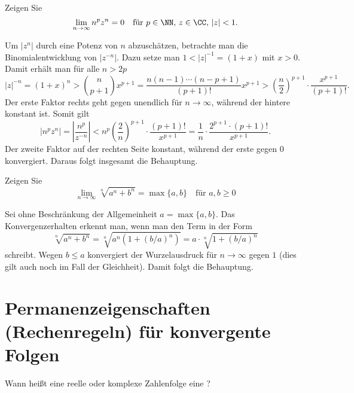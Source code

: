 \begin{frage}
Zeigen Sie
\[
  \lim_{n\to\infty} n^p z^n = 0\quad\text{für $p\in\NN,\,z\in\CC,\,|z|<1$.}
\]
\end{frage}

\begin{antwort}
  Um $\left| z^n \right|$ durch eine Potenz von $n$ abzuschätzen, betrachte man 
  die Binomialentwicklung von $\left| z^{-n} \right|$. Dazu 
  setze man $1<|z|^{-1}= (1+x)$ mit $x>0$. Damit erhält man für alle $n>2p$
  \[
  |z|^{-n}=(1+x)^n > \binom{n}{p+1} x^{p+1} = 
  \frac{ n(n-1)\cdots (n-p+1)}{ (p+1)! } x^{p+1} 
  > \left( \frac{n}{2} \right)^{p+1} \cdot \frac{x^{p+1}}{ (p+1)! }.
  \]
  Der erste Faktor rechts geht gegen unendlich für $n\to \infty$, während 
  der hintere konstant ist. Somit gilt
  \[
  \left| n^p z^n \right| = \left| \frac{n^p}{ z^{-n} } \right|  <  
  n^p \left(\frac{2}{n}\right)^{p+1} \cdot \frac{(p+1)!}{x^{p+1}} = 
  \frac{1}{n} \cdot \frac{2^{p+1} \cdot (p+1)!}{x^{p+1}}.
  \]
  Der zweite Faktor auf der rechten Seite konstant, während der erste 
  gegen 0 konvergiert. Daraus folgt insgesamt die Behauptung. 
  \AntEnd
\end{antwort}


\begin{frage}
  \label{q:folge_absch}
  Zeigen Sie
  \[
  \lim_{n\to\infty} \sqrt[n]{a^n+b^n}=\max\{a,b\} \quad\text{für $a,b\ge0$}
  \]
\end{frage}

\begin{antwort}
  Sei ohne Beschränkung der Allgemeinheit $a=\max\{ a,b \}$. 
  Das Konvergenzerhalten erkennt man, wenn man den Term in der 
  Form 
  \[
  \sqrt[n]{ a^n +b^n} = \sqrt[n]{ a^n ( 1+ (b/a)^n ) } = 
  a\cdot \sqrt[n]{ 1+(b/a)^n }
  \]
  schreibt. Wegen $b\le a$ konvergiert der Wurzelausdruck 
  für $n\to\infty$ gegen $1$ (dies gilt auch noch 
  im Fall der Gleichheit). Damit folgt die Behauptung.  
  \AntEnd
\end{antwort}




\section{Permanenzeigenschaften (Rechenregeln) 
  für konvergente  Folgen}


\begin{frage}%
  \label{02_null}
  Wann heißt eine reelle oder komplexe Zahlenfolge eine ?
\end{frage}

